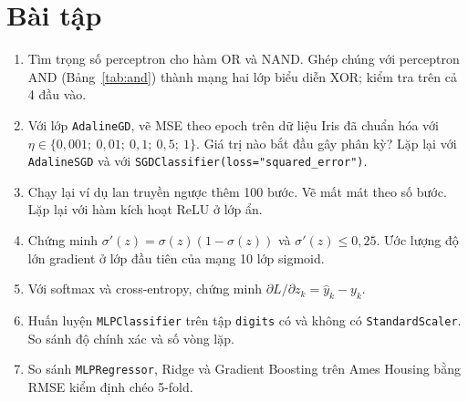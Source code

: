 \section{Bài tập}
\begin{enumerate}
    \item Tìm trọng số perceptron cho hàm OR và NAND. Ghép chúng với perceptron AND (Bảng~\ref{tab:and}) thành mạng hai lớp biểu diễn XOR; kiểm tra trên cả 4 đầu vào.
    \item Với lớp \texttt{AdalineGD}, vẽ MSE theo epoch trên dữ liệu Iris đã chuẩn hóa với $\eta \in \{0{,}001;\ 0{,}01;\ 0{,}1;\ 0{,}5;\ 1\}$. Giá trị nào bắt đầu gây phân kỳ? Lặp lại với \texttt{AdalineSGD} và với \texttt{SGDClassifier(loss="squared\_error")}.
    \item Chạy lại ví dụ lan truyền ngược thêm 100 bước. Vẽ mất mát theo số bước. Lặp lại với hàm kích hoạt ReLU ở lớp ẩn.
    \item Chứng minh $\sigma'(z) = \sigma(z)(1 - \sigma(z))$ và $\sigma'(z) \leq 0{,}25$. Ước lượng độ lớn gradient ở lớp đầu tiên của mạng 10 lớp sigmoid.
    \item Với softmax và cross-entropy, chứng minh $\partial L / \partial z_k = \hat{y}_k - y_k$.
    \item Huấn luyện \texttt{MLPClassifier} trên tập \texttt{digits} có và không có \texttt{StandardScaler}. So sánh độ chính xác và số vòng lặp.
    \item So sánh \texttt{MLPRegressor}, Ridge và Gradient Boosting trên Ames Housing bằng RMSE kiểm định chéo 5-fold.
\end{enumerate}

